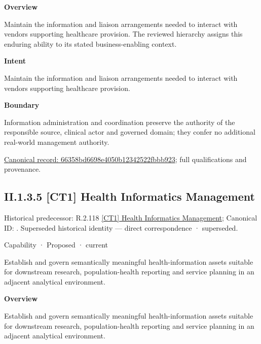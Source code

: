\textbf{Overview}



Maintain the information and liaison arrangements needed to interact with vendors supporting healthcare provision. The reviewed hierarchy assigns this enduring ability to its stated business-enabling context.



\textbf{Intent}



Maintain the information and liaison arrangements needed to interact with vendors supporting healthcare provision.



\textbf{Boundary}



Information administration and coordination preserve the authority of the responsible source, clinical actor and governed domain; they confer no additional real-world management authority.


{\footnotesize \href{../../../../continuum/strategy/capability/66358bd6698e4050b12342522fbbb923.md}{Canonical record: 66358bd6698e4050b12342522fbbb923}; full qualifications and provenance.}\par
\subsection*{II.1.3.5 [CT1] Health Informatics Management}
\label{navigation:II.1.3.5}

{\small Historical predecessor: R.2.118 \hyperref[element:50c56bac0dc540a2b392fc2376efc129]{[CT1] Health Informatics Management}; Canonical ID: \texttt{}. Superseded historical identity — direct correspondence · superseded.}\par
\label{element:a790b5f2c5a1497fa6ec09d7824da32e}
{\small Capability · Proposed · current}\par

Establish and govern semantically meaningful health-information assets suitable for downstream research, population-health reporting and service planning in an adjacent analytical environment.



\textbf{Overview}



Establish and govern semantically meaningful health-information assets suitable for downstream research, population-health reporting and service planning in an adjacent analytical environment.



